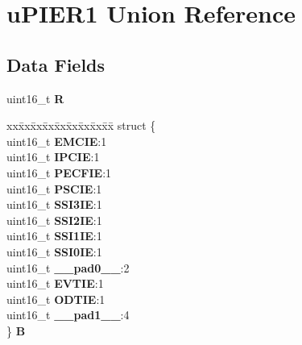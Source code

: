 \hypertarget{unionuPIER1}{}\section{u\+P\+I\+E\+R1 Union Reference}
\label{unionuPIER1}
\subsection*{Data Fields}
\begin{DoxyCompactItemize}
\item 
\mbox{\label{unionuPIER1_a97608ec99a7a281912dc91dc840d57ba}} 
uint16\+\_\+t {\bfseries R}
\item 
\mbox{\label{unionuPIER1_a011927a99c346bb970839d2be0e56e94}} 
\begin{tabbing}
xx\=xx\=xx\=xx\=xx\=xx\=xx\=xx\=xx\=\kill
struct \{\\
\>uint16\_t {\bfseries EMCIE}:1\\
\>uint16\_t {\bfseries IPCIE}:1\\
\>uint16\_t {\bfseries PECFIE}:1\\
\>uint16\_t {\bfseries PSCIE}:1\\
\>uint16\_t {\bfseries SSI3IE}:1\\
\>uint16\_t {\bfseries SSI2IE}:1\\
\>uint16\_t {\bfseries SSI1IE}:1\\
\>uint16\_t {\bfseries SSI0IE}:1\\
\>uint16\_t {\bfseries \_\_pad0\_\_}:2\\
\>uint16\_t {\bfseries EVTIE}:1\\
\>uint16\_t {\bfseries ODTIE}:1\\
\>uint16\_t {\bfseries \_\_pad1\_\_}:4\\
\} {\bfseries B}\\


\end{tabbing}
\end{DoxyCompactItemize}
